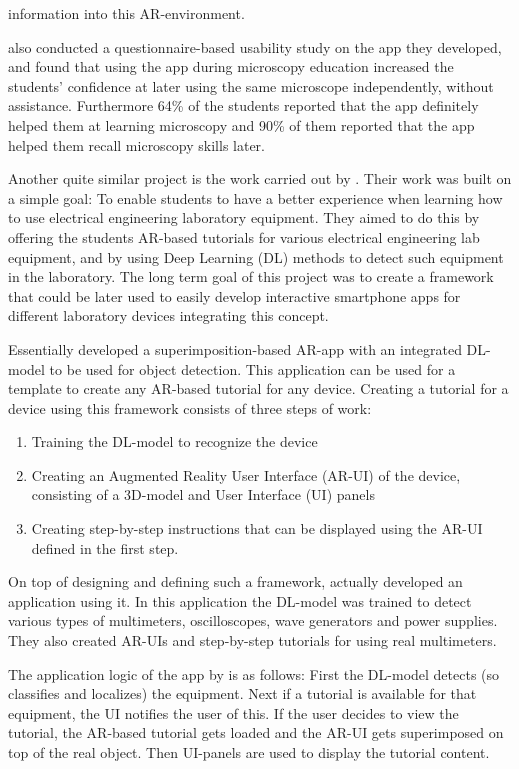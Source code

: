 information into this AR-environment.\cite{pylvanainen} \par
	\textcite{pylvanainen} also conducted a questionnaire-based usability 
study on the app they developed, and found that using the app during 
microscopy education increased the students' confidence at later using the 
same microscope independently, without assistance. Furthermore 64\% of the 
students reported that the app definitely helped them at learning microscopy 
and 90\% of them reported that the app helped them recall microscopy skills 
later.\cite{pylvanainen} \par
	Another quite similar project is the work carried out by 
\textcite{estrada}. Their work was built on a simple goal: To enable students 
to have a better experience when learning how to use electrical engineering 
laboratory equipment. They aimed to do this by offering the students AR-based 
tutorials for various electrical engineering lab equipment, and by using Deep 
Learning (DL) methods to detect such equipment in the 
laboratory.\cite{estrada} The long term goal of this project was to create a 
framework that could be later used to easily develop interactive smartphone 
apps for different laboratory devices integrating this 
concept.\cite{estrada} \par
	Essentially \textcite{estrada} developed a superimposition-based 
AR-app with an integrated DL-model to be used for object detection. This 
application can be used for a template to create any AR-based tutorial for 
any device. Creating a tutorial for a device using this framework consists of 
three steps of work:
\begin{enumerate}
	\item Training the DL-model to recognize the device
	\item Creating an Augmented Reality User Interface (AR-UI) of the device, consisting of a 3D-model and User Interface (UI) panels
	\item Creating step-by-step instructions that can be displayed using the AR-UI defined in the first step.
\end{enumerate} \par
	On top of designing and defining such a framework, \textcite{estrada} 
actually developed an application using it. In this application the DL-model 
was trained to detect various types of multimeters, oscilloscopes, wave 
generators and power supplies. They also created AR-UIs and step-by-step 
tutorials for using real multimeters.\cite{estrada}\par
	The application logic of the app by \textcite{estrada} is as follows: 
First the DL-model detects (so classifies and localizes) the equipment. Next 
if a tutorial is available for that equipment, the UI notifies the user of this.
If the user decides to view the tutorial, the AR-based tutorial gets loaded 
and the AR-UI gets superimposed on top of the real object. Then UI-panels are 
used to display the tutorial content. \par
